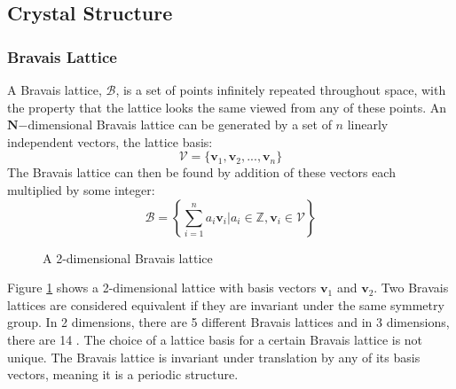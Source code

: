 \documentclass[12pt]{article}
\begin{document}
\subsection{Crystal Structure}
\subsubsection{Bravais Lattice}
A Bravais lattice, $\mathcal{B}$, is a set of points infinitely repeated throughout space, with the property that the lattice looks the same viewed from any of these points. 
An $\mathbf{N}\mathrm{-dimensional}$ Bravais lattice can be generated by a set of $n$ linearly independent vectors, the lattice basis:
\begin{equation}\label{eq:lattice_basis}
	\mathcal{V} = \{\mathbf{v}_1, \mathbf{v}_2, ..., \mathbf{v}_n\}
\end{equation}
The Bravais lattice can then be found by addition of these vectors each multiplied by some integer:
\begin{equation}\label{eq:bravais_lattice}
	\mathcal{B} = \left \{\sum_{i=1}^n a_i\mathbf{v}_i \Big | a_i \in \mathbb{Z}, \mathbf{v}_i \in \mathcal{V}  \right \}
\end{equation}

\begin{figure}
\centering
{}%
\caption{A 2-dimensional Bravais lattice}
\label{fig:lattice_basis}
\end{figure}

Figure \ref{fig:lattice_basis} shows a 2-dimensional lattice with basis vectors $\mathbf{v}_1$ and $\mathbf{v}_2$. Two Bravais lattices are considered equivalent if they are invariant under the same symmetry group. In 2 dimensions, there are 5 different Bravais lattices and in 3 dimensions, there are 14 \cite{kittel2005introduction}. The choice of a lattice basis for a certain Bravais lattice is not unique.
The Bravais lattice is invariant under translation by any of its basis vectors, meaning it is a periodic structure. 
\end{document}
